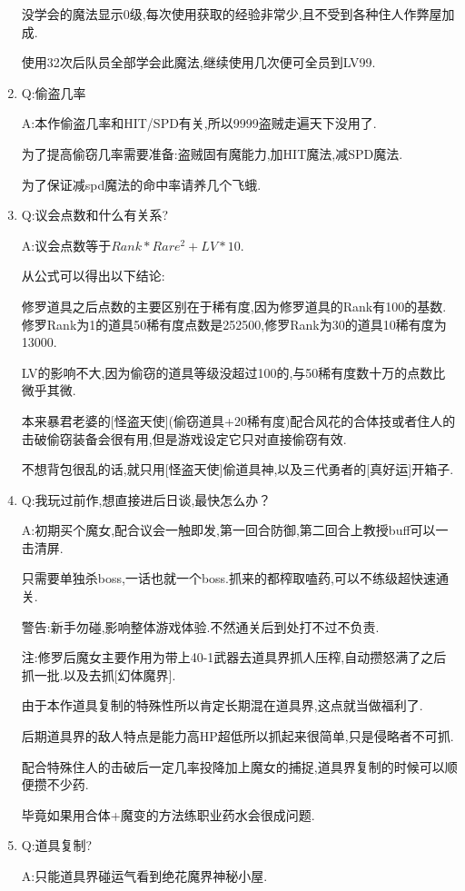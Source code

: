 \begin{enumerate}
	没学会的魔法显示0级,每次使用获取的经验非常少,且不受到各种住人作弊屋加成.

	使用32次后队员全部学会此魔法,继续使用几次便可全员到LV99.

	\item
	Q:偷盗几率

	A:本作偷盗几率和HIT/SPD有关,所以9999盗贼走遍天下没用了.

	为了提高偷窃几率需要准备:盗贼固有魔能力,加HIT魔法,减SPD魔法.

	为了保证减spd魔法的命中率请养几个飞蛾.

	\item
	Q:议会点数和什么有关系?

	A:议会点数等于$Rank*Rare^2+LV*10$.

	从公式可以得出以下结论:

	修罗道具之后点数的主要区别在于稀有度,因为修罗道具的Rank有100的基数.修罗Rank为1的道具50稀有度点数是252500,修罗Rank为30的道具10稀有度为13000.

	LV的影响不大,因为偷窃的道具等级没超过100的,与50稀有度数十万的点数比微乎其微.

	本来暴君老婆的[怪盗天使](偷窃道具+20稀有度)配合风花的合体技或者住人的击破偷窃装备会很有用,但是游戏设定它只对直接偷窃有效.

	不想背包很乱的话,就只用[怪盗天使]偷道具神,以及三代勇者的[真好运]开箱子.

	\item
	Q:我玩过前作,想直接进后日谈,最快怎么办？

	A:初期买个魔女,配合议会一触即发,第一回合防御,第二回合上教授buff可以一击清屏.

	只需要单独杀boss,一话也就一个boss.抓来的都榨取嗑药,可以不练级超快速通关.

	警告:新手勿碰,影响整体游戏体验.不然通关后到处打不过不负责.

	注:修罗后魔女主要作用为带上40-1武器去道具界抓人压榨,自动攒怒满了之后抓一批.以及去抓[幻体魔界].

	由于本作道具复制的特殊性所以肯定长期混在道具界,这点就当做福利了.

	后期道具界的敌人特点是能力高HP超低所以抓起来很简单,只是侵略者不可抓.

	配合特殊住人的击破后一定几率投降加上魔女的捕捉,道具界复制的时候可以顺便攒不少药.

	毕竟如果用合体+魔变的方法练职业药水会很成问题.


	\item
	Q:道具复制?

	A:只能道具界碰运气看到绝花魔界神秘小屋.


\end{enumerate}
